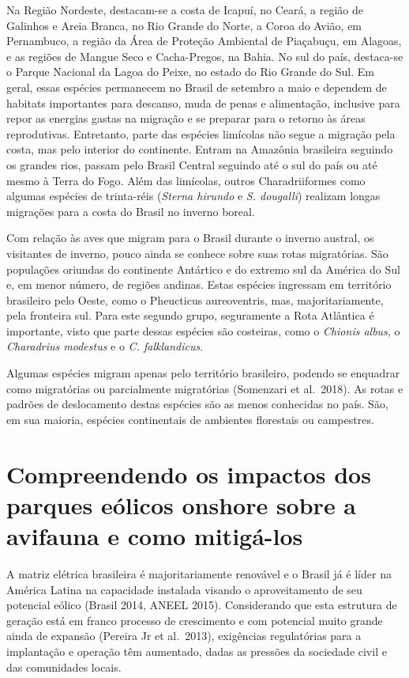 \documentclass[
  oneside]{scrbook}
\begin{document}
Na Região Nordeste, destacam-se a costa de Icapuí, no Ceará, a região de Galinhos e Areia Branca, no Rio Grande do Norte, a Coroa do Avião, em Pernambuco, a região da Área de Proteção Ambiental de Piaçabuçu, em Alagoas, e as regiões de Mangue Seco e Cacha-Pregos, na Bahia. No sul do país, destaca-se o Parque Nacional da Lagoa do Peixe, no estado do Rio Grande do Sul. Em geral, essas espécies permanecem no Brasil de setembro a maio e dependem de habitats importantes para descanso, muda de penas e alimentação, inclusive para repor as energias gastas na migração e se preparar para o retorno às áreas reprodutivas. Entretanto, parte das espécies limícolas não segue a migração pela costa, mas pelo interior do continente. Entram na Amazônia brasileira seguindo os grandes rios, passam pelo Brasil Central seguindo até o sul do país ou até mesmo à Terra do Fogo. Além das limícolas, outros Charadriiformes como algumas espécies de trinta-réis (\emph{Sterna hirundo} e \emph{S. dougalli}) realizam longas migrações para a costa do Brasil no inverno boreal.

Com relação às aves que migram para o Brasil durante o inverno austral, os visitantes de inverno, pouco ainda se conhece sobre suas rotas migratórias. São populações oriundas do continente Antártico e do extremo sul da América do Sul e, em menor número, de regiões andinas. Estas espécies ingressam em território brasileiro pelo Oeste, como o Pheucticus aureoventris, mas, majoritariamente, pela fronteira sul. Para este segundo grupo, seguramente a Rota Atlântica é importante, visto que parte dessas espécies são costeiras, como o \emph{Chionis albus}, o \emph{Charadrius modestus} e o \emph{C. falklandicus}.

Algumas espécies migram apenas pelo território brasileiro, podendo se enquadrar como migratórias ou parcialmente migratórias (Somenzari et al.~2018). As rotas e padrões de deslocamento destas espécies são as menos conhecidas no país. São, em sua maioria, espécies continentais de ambientes florestais ou campestres.

\hypertarget{impactos}{%
\section{Compreendendo os impactos dos parques eólicos onshore sobre a avifauna e como mitigá-los}\label{impactos}}

A matriz elétrica brasileira é majoritariamente renovável e o Brasil já é líder na América Latina na capacidade instalada visando o aproveitamento de seu potencial eólico (Brasil 2014, ANEEL 2015). Considerando que esta estrutura de geração está em franco processo de crescimento e com potencial muito grande ainda de expansão (Pereira Jr et al.~2013), exigências regulatórias para a implantação e operação têm aumentado, dadas as pressões da sociedade civil e das comunidades locais.
\end{document}
